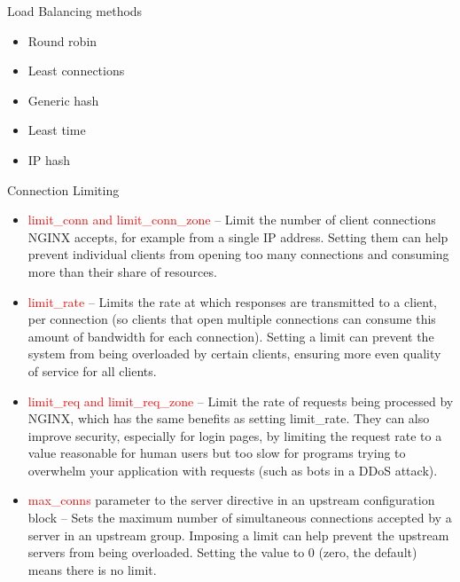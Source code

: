 \documentclass{beamer}
\begin{document}
\begin{frame}{Load Balancing methods}
\begin{itemize}
	\item Round robin
	\item Least connections
	\item Generic hash
	\item Least time
	\item IP hash
\end{itemize}
\end{frame}


\begin{frame}{Connection Limiting}
\scriptsize




\begin{itemize}
	\item \textcolor{red}{limit\_conn and limit\_conn\_zone} – Limit the number of client connections NGINX accepts, for example from a single IP address. Setting them can help prevent individual clients from opening too many connections and consuming more than their share of resources.
	\item \textcolor{red}{limit\_rate} – Limits the rate at which responses are transmitted to a client, per connection (so clients that open multiple connections can consume this amount of bandwidth for each connection). Setting a limit can prevent the system from being overloaded by certain clients, ensuring more even quality of service for all clients.
	\item \textcolor{red}{limit\_req and limit\_req\_zone} – Limit the rate of requests being processed by NGINX, which has the same benefits as setting limit\_rate. They can also improve security, especially for login pages, by limiting the request rate to a value reasonable for human users but too slow for programs trying to overwhelm your application with requests (such as bots in a DDoS attack).
	\item \textcolor{red}{max\_conns}  parameter to the server directive in an upstream configuration block – Sets the maximum number of simultaneous connections accepted by a server in an upstream group. Imposing a limit can help prevent the upstream servers from being overloaded. Setting the value to 0 (zero, the default) means there is no limit.
\end{itemize}
\end{frame}
\end{document}

